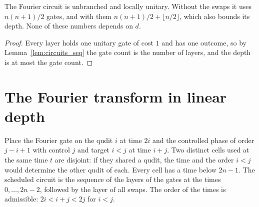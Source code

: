 \begin{theorem}
    \label{thm:qft_cost}
    \leanok
    The Fourier circuit is unbranched and locally unitary. Without the swaps it uses
    $n(n+1)/2$ gates, and with them $n(n+1)/2+\lfloor n/2\rfloor$, which also bounds
    its depth. None of these numbers depends on $d$.
\end{theorem}
\begin{proof}\leanok
    Every layer holds one unitary gate of cost $1$ and has one outcome, so by
    Lemma~\ref{lem:circuits_seq} the gate count is the number of layers, and the depth
    is at most the gate count.
\end{proof}

\section{The Fourier transform in linear depth}
\label{sec:qft_parallel}

\begin{definition}
    \label{def:qft_parallel}
    \leanok
    Place the Fourier gate on the qudit $i$ at time $2i$ and the controlled phase of
    order $j-i+1$ with control $j$ and target $i<j$ at time $i+j$. Two distinct cells
    used at the same time $t$ are disjoint: if they shared a qudit, the time and the
    order $i<j$ would determine the other qudit of each. Every cell has a time below
    $2n-1$. The scheduled circuit is the sequence of the layers of the gates at the
    times $0,\dots,2n-2$, followed by the layer of all swaps. The order of the times is
    admissible: $2i<i+j<2j$ for $i<j$.
\end{definition}

